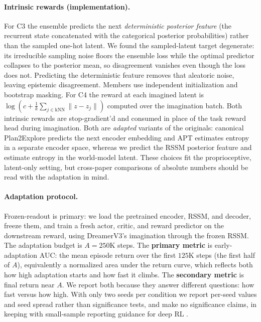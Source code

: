\documentclass{article}
\begin{document}
\paragraph{Intrinsic rewards (implementation).}
For C3 the ensemble predicts the next \emph{deterministic posterior feature}
(the recurrent state concatenated with the categorical posterior probabilities)
rather than the sampled one-hot latent. We found the sampled-latent target
degenerate: its irreducible sampling noise floors the ensemble loss while the
optimal predictor collapses to the posterior mean, so disagreement vanishes even
though the loss does not. Predicting the deterministic feature removes that
aleatoric noise, leaving epistemic disagreement. Members use independent
initialization and bootstrap masking. For C4 the reward at each imagined latent
is $\log(c + \tfrac{1}{k}\sum_{j \in \mathrm{kNN}} \lVert z - z_j \rVert)$
computed over the imagination batch. Both intrinsic rewards are stop-gradient'd
and consumed in place of the task reward head during imagination. Both are
\emph{adapted} variants of the originals: canonical Plan2Explore predicts the
next encoder embedding and APT estimates entropy in a separate encoder space,
whereas we predict the RSSM posterior feature and estimate entropy in the
world-model latent. These choices fit the proprioceptive, latent-only setting,
but cross-paper comparisons of absolute numbers should be read with the
adaptation in mind.

\paragraph{Adaptation protocol.}
Frozen-readout is primary: we load the pretrained encoder, RSSM, and decoder,
freeze them, and train a fresh actor, critic, and reward predictor on the
downstream reward, using DreamerV3's imagination through the frozen RSSM. The
adaptation budget is $A=250$K steps. The \textbf{primary metric} is
early-adaptation AUC: the mean episode return over the first $125$K steps (the
first half of $A$), equivalently a normalized area under the return curve, which
reflects both how high adaptation starts and how fast it climbs. The
\textbf{secondary metric} is final return near $A$. We report both because they
answer different questions: how fast versus how high. With only two seeds per
condition we report per-seed values and seed spread rather than significance
tests, and make no significance claims, in keeping with small-sample reporting
guidance for deep RL \citep{agarwal2021rliable}.
\end{document}
